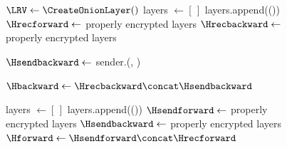 \begin{figure}[t]
  \begin{algorithmic}[1]
      \State $\LRV \gets \CreateOnionLayer()$
      \State layers $\gets [\,]$
        \State layers.append(\CreateOnionLayer())
      \EndWhile
      \State $\Hrecforward \gets$ properly encrypted layers
      \State $\Hrecbackward \gets$ properly encrypted layers

      \State $\Hsendbackward \gets$ sender.\Send(\Hrecforward, \LRV)

      \State $\Hbackward \gets \Hrecbackward \concat \Hsendbackward$ \label{hbackward}
    \EndFunction
  \end{algorithmic}

  \vspace{0.3em}
  \begin{algorithmic}[1]
    \Function{\Send}{\Hrecforward, \LRV}
      \State layers $\gets [\,]$
        \State layers.append(\CreateOnionLayer())
      \EndWhile
      \State $\Hsendforward \gets$ properly encrypted layers
      \State $\Hsendbackward \gets$ properly encrypted layers
      \State $\Hforward \gets \Hsendforward \concat \Hrecforward$ \label{hforward}
      \State \Return \Hsendbackward

    \EndFunction
  \end{algorithmic}


\end{figure}
